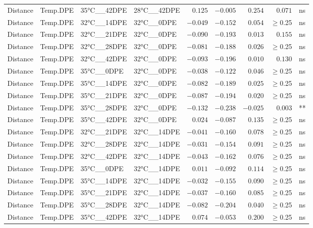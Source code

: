 \documentclass[
]{article}
\begin{document}
\begin{longtable}{llllrrrrl}
Distance & Temp.DPE & 35°C\_\_42DPE & 28°C\_\_42DPE & $0.125$ & $-0.005$ & $0.254$ & $0.071$ & ns \\ 
Distance & Temp.DPE & 32°C\_\_14DPE & 32°C\_\_0DPE & $-0.049$ & $-0.152$ & $0.054$ & $\geq$0.25 & ns \\ 
Distance & Temp.DPE & 32°C\_\_21DPE & 32°C\_\_0DPE & $-0.090$ & $-0.193$ & $0.013$ & $0.155$ & ns \\ 
Distance & Temp.DPE & 32°C\_\_28DPE & 32°C\_\_0DPE & $-0.081$ & $-0.188$ & $0.026$ & $\geq$0.25 & ns \\ 
Distance & Temp.DPE & 32°C\_\_42DPE & 32°C\_\_0DPE & $-0.093$ & $-0.196$ & $0.010$ & $0.130$ & ns \\ 
Distance & Temp.DPE & 35°C\_\_0DPE & 32°C\_\_0DPE & $-0.038$ & $-0.122$ & $0.046$ & $\geq$0.25 & ns \\ 
Distance & Temp.DPE & 35°C\_\_14DPE & 32°C\_\_0DPE & $-0.082$ & $-0.189$ & $0.025$ & $\geq$0.25 & ns \\ 
Distance & Temp.DPE & 35°C\_\_21DPE & 32°C\_\_0DPE & $-0.087$ & $-0.194$ & $0.020$ & $\geq$0.25 & ns \\ 
Distance & Temp.DPE & 35°C\_\_28DPE & 32°C\_\_0DPE & $-0.132$ & $-0.238$ & $-0.025$ & $0.003$ & ** \\ 
Distance & Temp.DPE & 35°C\_\_42DPE & 32°C\_\_0DPE & $0.024$ & $-0.087$ & $0.135$ & $\geq$0.25 & ns \\ 
Distance & Temp.DPE & 32°C\_\_21DPE & 32°C\_\_14DPE & $-0.041$ & $-0.160$ & $0.078$ & $\geq$0.25 & ns \\ 
Distance & Temp.DPE & 32°C\_\_28DPE & 32°C\_\_14DPE & $-0.031$ & $-0.154$ & $0.091$ & $\geq$0.25 & ns \\ 
Distance & Temp.DPE & 32°C\_\_42DPE & 32°C\_\_14DPE & $-0.043$ & $-0.162$ & $0.076$ & $\geq$0.25 & ns \\ 
Distance & Temp.DPE & 35°C\_\_0DPE & 32°C\_\_14DPE & $0.011$ & $-0.092$ & $0.114$ & $\geq$0.25 & ns \\ 
Distance & Temp.DPE & 35°C\_\_14DPE & 32°C\_\_14DPE & $-0.032$ & $-0.155$ & $0.090$ & $\geq$0.25 & ns \\ 
Distance & Temp.DPE & 35°C\_\_21DPE & 32°C\_\_14DPE & $-0.037$ & $-0.160$ & $0.085$ & $\geq$0.25 & ns \\ 
Distance & Temp.DPE & 35°C\_\_28DPE & 32°C\_\_14DPE & $-0.082$ & $-0.204$ & $0.040$ & $\geq$0.25 & ns \\ 
Distance & Temp.DPE & 35°C\_\_42DPE & 32°C\_\_14DPE & $0.074$ & $-0.053$ & $0.200$ & $\geq$0.25 & ns \\ 

\end{longtable}
\end{document}
